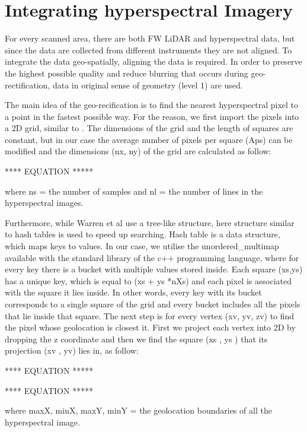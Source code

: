 \documentclass{subfiles}
\begin{document}
	
\section{Integrating hyperspectral Imagery}


	\par For every scanned area, there are both FW LiDAR and hyperspectral data, but since the data are collected from different instruments they are not aligned. To integrate the data geo-spatially, aligning the data is required. In order to preserve the highest possible quality and reduce blurring that occurs during geo-rectification, data in original sense of geometry (level 1) are used.
	
	\par The main idea of the geo-recification is to find the nearest hyperspectral pixel to a point in the fastest possible way. For the reason, we first import the pixels into a 2D grid, similar to \cite{Warren2014}. The dimensions of the grid and the length of squares are constant, but in our case the average number of pixels per square (Aps) can be modified and the dimensions (nx, ny) of the grid are calculated as follow:
	
	**** EQUATION *****
	
	\par where ns = the number of samples and
	nl = the number of lines in the hyperspectral images.
	
	\par Furthermore, while Warren et al use a tree-like structure, here  structure similar to hash tables is used to speed up searching. Hash table is a data structure, which maps keys to values. In our case, we utilise the unordered\_multimap available with the standard library of the c++ programming language, where for every key there is a bucket with multiple values stored inside. Each square (xs,ys)	has a unique key, which is equal to (xs + ys *nXs) and each pixel is associated with the square it lies inside. In other words, every key with its bucket corresponds to a single square of the grid and every bucket includes all the pixels that lie inside that square. The next step is for every vertex (xv, yv, zv) to find the pixel whose geolocation is closest it. First we project each vertex into 2D by dropping the z coordinate and then we find the square (xs , ys ) that its projection (xv , yv) lies in, as follow:
	
	**** EQUATION *****
	
	**** EQUATION *****
	\par where maxX, minX, maxY, minY = the geolocation boundaries of all the hyperspectral image.
	
\end{document}

